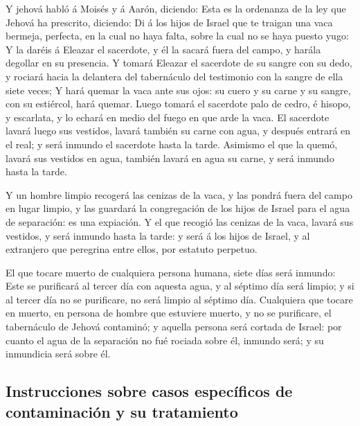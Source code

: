  Y jehová habló á Moisés y á Aarón, diciendo: 
Esta es la ordenanza de la ley que Jehová ha prescrito, diciendo: Di á
los hijos de Israel que te traigan una vaca bermeja, perfecta, en la
cual no haya falta, sobre la cual no se haya puesto yugo:  Y
la daréis á Eleazar el sacerdote, y él la sacará fuera del campo, y
harála degollar en su presencia.  Y tomará Eleazar el
sacerdote de su sangre con su dedo, y rociará hacia la delantera del
tabernáculo del testimonio con la sangre de ella siete veces;
 Y hará quemar la vaca ante sus ojos: su cuero y su carne y
su sangre, con su estiércol, hará quemar.  Luego tomará el
sacerdote palo de cedro, é hisopo, y escarlata, y lo echará en medio del
fuego en que arde la vaca.  El sacerdote lavará luego sus
vestidos, lavará también su carne con agua, y después entrará en el
real; y será inmundo el sacerdote hasta la tarde.  Asimismo
el que la quemó, lavará sus vestidos en agua, también lavará en agua su
carne, y será inmundo hasta la tarde.

 Y un hombre limpio recogerá las cenizas de la vaca, y las
pondrá fuera del campo en lugar limpio, y las guardará la congregación
de los hijos de Israel para el agua de separación: es una expiación.
 Y el que recogió las cenizas de la vaca, lavará sus
vestidos, y será inmundo hasta la tarde: y será á los hijos de Israel, y
al extranjero que peregrina entre ellos, por estatuto perpetuo.

 El que tocare muerto de cualquiera persona humana, siete
días será inmundo:  Este se purificará al tercer día con
aquesta agua, y al séptimo día será limpio; y si al tercer día no se
purificare, no será limpio al séptimo día.  Cualquiera que
tocare en muerto, en persona de hombre que estuviere muerto, y no se
purificare, el tabernáculo de Jehová contaminó; y aquella persona será
cortada de Israel: por cuanto el agua de la separación no fué rociada
sobre él, inmundo será; y su inmundicia será sobre él.

\hypertarget{instrucciones-sobre-casos-especuxedficos-de-contaminaciuxf3n-y-su-tratamiento}{%
\subsection{Instrucciones sobre casos específicos de contaminación y su
tratamiento}\label{instrucciones-sobre-casos-especuxedficos-de-contaminaciuxf3n-y-su-tratamiento}}

